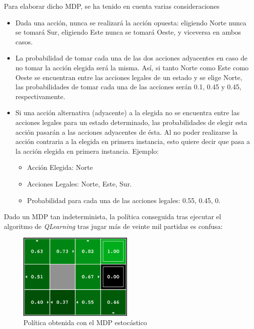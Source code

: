 \documentclass[12pt]{article}
\begin{document}
Para elaborar dicho MDP, se ha tenido en cuenta varias consideraciones
\begin{itemize}
    \item Dada una acción, nunca se realizará la acción opuesta: eligiendo Norte nunca se tomará Sur, eligiendo Este nunca se tomará Oeste, y viceversa en ambos casos.
    \item La probabilidad de tomar cada una de las dos acciones adyacentes en caso de no tomar la acción elegida será la misma. Así, si tanto Norte como Este como Oeste se encuentran entre las acciones legales de un estado y se elige Norte, las probabilidades de tomar cada una de las acciones serán 0.1, 0.45 y 0.45, respectivamente.
    \item Si una acción alternativa (adyacente) a la elegida no se encuentra entre las acciones legales para un estado determinado, las probabilidades de elegir esta acción pasarán a las acciones adyacentes de ésta. Al no poder realizarse la acción contraria a la elegida en primera instancia, esto quiere decir que pasa a la acción elegida en primera instancia. Ejemplo:
    \begin{itemize}
        \item Acción Elegida: Norte
        \item Acciones Legales: Norte, Este, Sur.
        \item Probabilidad para cada una de las acciones legales: 0.55, 0.45, 0.
    \end{itemize}
\end{itemize}

Dado un MDP tan indeterminista, la política conseguida tras ejecutar el algoritmo de \textit{QLearning} tras jugar más de veinte mil partidas es confusa:

\begin{figure}[h]
    \centering
    \includegraphics[width=0.5\textwidth]{policy_stochastic}
    \caption{Política obtenida con el MDP estocástico}
\end{figure}
\end{document}
